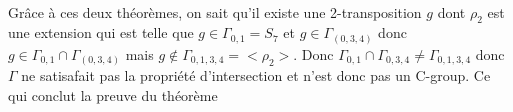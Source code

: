 \paragraph{}
Grâce à ces deux théorèmes, on sait qu'il existe une 2-transposition $g$ dont $\rho_2$ est une extension qui est telle que $ g \in \Gamma_{0,1} = S_7$ et $g \in \Gamma_(0,3,4)$ donc $g \in \Gamma_{0,1} \cap \Gamma_(0,3,4)$ mais $g \notin \Gamma_{0,1,3,4} = <\rho_2>$. Donc $\Gamma_{0,1} \cap \Gamma_{0,3,4} \neq \Gamma_{0,1,3,4}$ donc $\Gamma$ ne satisafait pas la propriété d'intersection et n'est donc pas un C-group. Ce qui conclut la preuve du théorème
